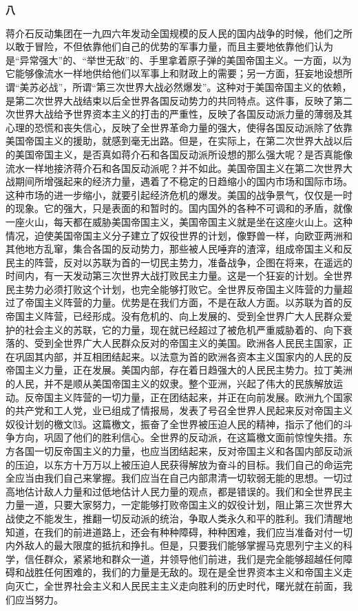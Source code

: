 \documentclass[UTF-8, a5paper, 12pt]{ctexart}
\begin{document}
\textbf{八}


蒋介石反动集团在一九四六年发动全国规模的反人民的国内战争的时候，他们之所以敢于冒险，不但依靠他们自己的优势的军事力量，而且主要地依靠他们认为是“异常强大”的、“举世无敌”的、手里拿着原子弹的美国帝国主义。一方面，以为它能够像流水一样地供给他们以军事上和财政上的需要；另一方面，狂妄地设想所谓“美苏必战”，所谓“第三次世界大战必然爆发”。这种对于美国帝国主义的依赖，是第二次世界大战结束以后全世界各国反动势力的共同特点。这件事，反映了第二次世界大战给予世界资本主义的打击的严重性，反映了各国反动派力量的薄弱及其心理的恐慌和丧失信心，反映了全世界革命力量的强大，使得各国反动派除了依靠美国帝国主义的援助，就感到毫无出路。但是，在实际上，在第二次世界大战以后的美国帝国主义，是否真如蒋介石和各国反动派所设想的那么强大呢？是否真能像流水一样地接济蒋介石和各国反动派呢？并不如此。美国帝国主义在第二次世界大战期间所增强起来的经济力量，遇着了不稳定的日趋缩小的国内市场和国际市场。这种市场的进一步缩小，就要引起经济危机的爆发。美国的战争景气，仅仅是一时的现象。它的强大，只是表面的和暂时的。国内国外的各种不可调和的矛盾，就像一座火山，每天都在威胁美国帝国主义，美国帝国主义就是坐在这座火山上。这种情况，迫使美国帝国主义分子建立了奴役世界的计划，像野兽一样，向欧亚两洲和其他地方乱窜，集合各国的反动势力，那些被人民唾弃的渣滓，组成帝国主义和反民主的阵营，反对以苏联为首的一切民主势力，准备战争，企图在将来，在遥远的时间内，有一天发动第三次世界大战打败民主力量。这是一个狂妄的计划。全世界民主势力必须打败这个计划，也完全能够打败它。全世界反帝国主义阵营的力量超过了帝国主义阵营的力量。优势是在我们方面，不是在敌人方面。以苏联为首的反帝国主义阵营，已经形成。没有危机的、向上发展的、受到全世界广大人民群众爱护的社会主义的苏联，它的力量，现在就已经超过了被危机严重威胁着的、向下衰落的、受到全世界广大人民群众反对的帝国主义的美国。欧洲各人民民主国家，正在巩固其内部，并互相团结起来。以法意为首的欧洲各资本主义国家内的人民的反帝国主义力量，正在发展。美国内部，存在着日趋强大的人民民主势力。拉丁美洲的人民，并不是顺从美国帝国主义的奴隶。整个亚洲，兴起了伟大的民族解放运动。反帝国主义阵营的一切力量，正在团结起来，并正在向前发展。欧洲九个国家的共产党和工人党，业已组成了情报局，发表了号召全世界人民起来反对帝国主义奴役计划的檄文⒀。这篇檄文，振奋了全世界被压迫人民的精神，指示了他们的斗争方向，巩固了他们的胜利信心。全世界的反动派，在这篇檄文面前惊惶失措。东方各国一切反帝国主义的力量，也应当团结起来，反对帝国主义和各国内部反动派的压迫，以东方十万万以上被压迫人民获得解放为奋斗的目标。我们自己的命运完全应当由我们自己来掌握。我们应当在自己内部肃清一切软弱无能的思想。一切过高地估计敌人力量和过低地估计人民力量的观点，都是错误的。我们和全世界民主力量一道，只要大家努力，一定能够打败帝国主义的奴役计划，阻止第三次世界大战使之不能发生，推翻一切反动派的统治，争取人类永久和平的胜利。我们清醒地知道，在我们的前进道路上，还会有种种障碍，种种困难，我们应当准备对付一切内外敌人的最大限度的抵抗和挣扎。但是，只要我们能够掌握马克思列宁主义的科学，信任群众，紧紧地和群众一道，并领导他们前进，我们是完全能够超越任何障碍和战胜任何困难的，我们的力量是无敌的。现在是全世界资本主义和帝国主义走向灭亡，全世界社会主义和人民民主主义走向胜利的历史时代，曙光就在前面，我们应当努力。
\end{document}
